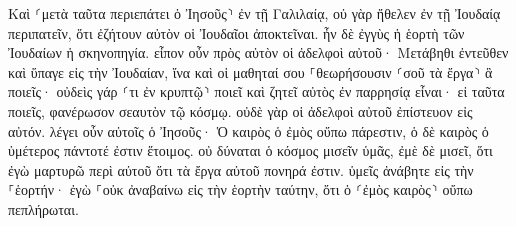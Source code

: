 \documentclass{openreader}
\begin{document}
Καὶ ⸂μετὰ ταῦτα περιεπάτει ὁ Ἰησοῦς⸃ ἐν τῇ Γαλιλαίᾳ, οὐ γὰρ ἤθελεν ἐν τῇ Ἰουδαίᾳ περιπατεῖν, ὅτι ἐζήτουν αὐτὸν οἱ Ἰουδαῖοι ἀποκτεῖναι. 
ἦν δὲ ἐγγὺς ἡ ἑορτὴ τῶν Ἰουδαίων ἡ σκηνοπηγία. 
εἶπον οὖν πρὸς αὐτὸν οἱ ἀδελφοὶ αὐτοῦ· Μετάβηθι ἐντεῦθεν καὶ ὕπαγε εἰς τὴν Ἰουδαίαν, ἵνα καὶ οἱ μαθηταί σου ⸀θεωρήσουσιν ⸂σοῦ τὰ ἔργα⸃ ἃ ποιεῖς· 
οὐδεὶς γάρ ⸂τι ἐν κρυπτῷ⸃ ποιεῖ καὶ ζητεῖ αὐτὸς ἐν παρρησίᾳ εἶναι· εἰ ταῦτα ποιεῖς, φανέρωσον σεαυτὸν τῷ κόσμῳ. 
οὐδὲ γὰρ οἱ ἀδελφοὶ αὐτοῦ ἐπίστευον εἰς αὐτόν. 
λέγει οὖν αὐτοῖς ὁ Ἰησοῦς· Ὁ καιρὸς ὁ ἐμὸς οὔπω πάρεστιν, ὁ δὲ καιρὸς ὁ ὑμέτερος πάντοτέ ἐστιν ἕτοιμος. 
οὐ δύναται ὁ κόσμος μισεῖν ὑμᾶς, ἐμὲ δὲ μισεῖ, ὅτι ἐγὼ μαρτυρῶ περὶ αὐτοῦ ὅτι τὰ ἔργα αὐτοῦ πονηρά ἐστιν. 
ὑμεῖς ἀνάβητε εἰς τὴν ⸀ἑορτήν· ἐγὼ ⸀οὐκ ἀναβαίνω εἰς τὴν ἑορτὴν ταύτην, ὅτι ὁ ⸂ἐμὸς καιρὸς⸃ οὔπω πεπλήρωται. 
\end{document}
